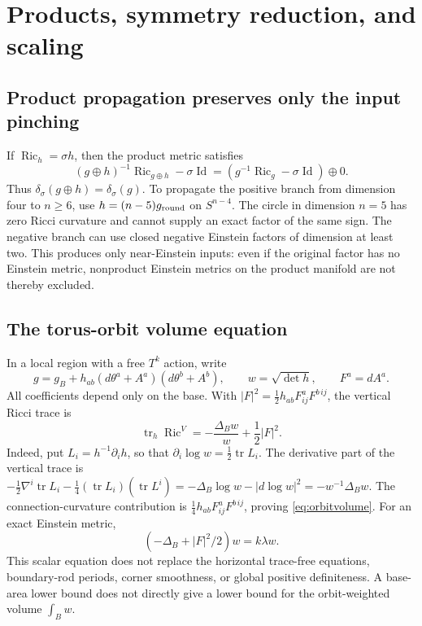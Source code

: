 \documentclass[a4paper,11pt]{article}
\numberwithin{equation}{section}
\theoremstyle{definition}
\newcommand{\Ric}{\operatorname{Ric}}
\newcommand{\tr}{\operatorname{tr}}
\newcommand{\Id}{\operatorname{Id}}
\begin{document}
\appendix
\section{Products, symmetry reduction, and scaling}
\subsection{Product propagation preserves only the input pinching}
If $\Ric_h=\sigma h$, then the product metric satisfies
\[
(g\oplus h)^{-1}\Ric_{g\oplus h}-\sigma\Id
=(g^{-1}\Ric_g-\sigma\Id)\oplus0.
\]
Thus $\delta_\sigma(g\oplus h)=\delta_\sigma(g)$. To propagate the positive branch from dimension four to $n\ge6$, use $h=(n-5)g_{\rm round}$ on $S^{n-4}$. The circle in dimension $n=5$ has zero Ricci curvature and cannot supply an exact factor of the same sign. The negative branch can use closed negative Einstein factors of dimension at least two. This produces only near-Einstein inputs: even if the original factor has no Einstein metric, nonproduct Einstein metrics on the product manifold are not thereby excluded.

\subsection{The torus-orbit volume equation}
In a local region with a free $T^k$ action, write
\[
g=g_B+h_{ab}(d\theta^a+A^a)(d\theta^b+A^b),\qquad
w=\sqrt{\det h},\qquad F^a=dA^a.
\]
All coefficients depend only on the base. With $|F|^2=\frac12h_{ab}F^a_{ij}F^{b\,ij}$, the vertical Ricci trace is
\begin{equation}\label{eq:orbitvolume}
\tr_h\Ric^V=-\frac{\Delta_Bw}{w}+\frac12|F|^2 .
\end{equation}
Indeed, put $L_i=h^{-1}\partial_i h$, so that
$\partial_i\log w=\frac12\tr L_i$. The derivative part of the vertical trace is
$-\frac12\nabla^i\tr L_i-\frac14(\tr L_i)(\tr L^i)
=-\Delta_B\log w-|d\log w|^2=-w^{-1}\Delta_Bw$.
The connection-curvature contribution is $\frac14h_{ab}F^a_{ij}F^{b\,ij}$, proving \eqref{eq:orbitvolume}.
For an exact Einstein metric,
\[
(-\Delta_B+|F|^2/2)w=k\lambda w.
\]
This scalar equation does not replace the horizontal trace-free equations, boundary-rod periods, corner smoothness, or global positive definiteness. A base-area lower bound does not directly give a lower bound for the orbit-weighted volume $\int_Bw$.
\end{document}

